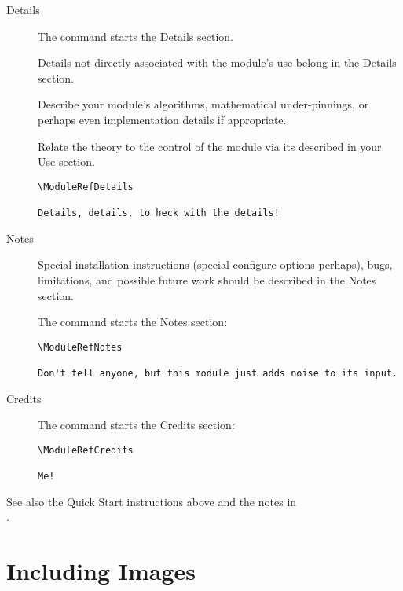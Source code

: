 \documentclass[11pt]{article}
\begin{document}
\begin{description}
\item[Details] \mbox{}
  \label{sec:details}
  
  The  command starts the Details section.

  Details not directly associated with the module's use belong in
  the Details section.
  
  Describe your module's algorithms, mathematical under-pinnings, or
  perhaps even implementation details if appropriate.
  
  Relate the theory to the control of the module via its \gui{}
  described in your Use section.

\begin{verbatim}
\ModuleRefDetails

Details, details, to heck with the details!
\end{verbatim}

\item[Notes]\mbox{}
  \label{sec:notes}
  
  Special installation instructions (special configure options
  perhaps), bugs, limitations, and possible future work should be
  described in the Notes section.

  The  command starts the Notes section:

\begin{verbatim}
\ModuleRefNotes

Don't tell anyone, but this module just adds noise to its input.
\end{verbatim}

\item[Credits]\mbox{}
  \label{sec:credits}
  
  The  command starts the Credits section:

\begin{verbatim}
\ModuleRefCredits

Me!
\end{verbatim}
\end{description}

See also the Quick Start instructions above and the notes in
\\ .

\section{Including Images}
\label{sec:inclimg}
\end{document}
